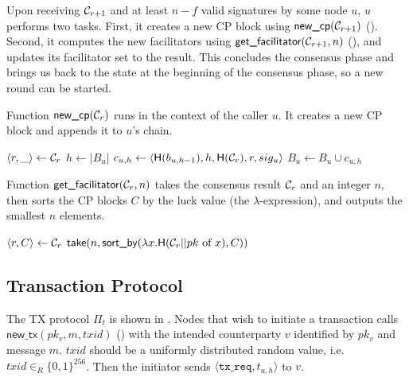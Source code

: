 Upon receiving $\mathcal{C}_{r + 1}$ and at least $n - f$ valid signatures by some node $u$, $u$ performs two tasks.
First, it creates a new CP block using $\textsf{new\_cp}(\mathcal{C}_{r + 1})$ ().
Second, it computes the new facilitators using $\textsf{get\_facilitator}(\mathcal{C}_{r + 1}, n)$ (),
and updates its facilitator set to the result.
This concludes the consensus phase and brings us back to the state at the beginning of the consensus phase,
so a new round can be started.

\begin{algorithm}
\caption{Function $\textsf{new\_cp}(\mathcal{C}_r)$ runs in the context of the caller $u$.
It creates a new CP block and appends it to $u$'s chain.}
\label{alg:new-cp}
\begin{algorithmic}
\State $\langle r, \_ \rangle \gets \mathcal{C}_r$
\State $h \gets |B_u|$
\State $c_{u, h} \gets \langle \textsf{H}(b_{u, h-1}), h, \textsf{H}(\mathcal{C}_r), r, sig_u \rangle$
\State $B_u \gets B_u \cup c_{u, h}$
\end{algorithmic}
\end{algorithm}

\begin{algorithm}
\caption{Function $\textsf{get\_facilitator}(\mathcal{C}_r, n)$ takes the consensus result $\mathcal{C}_r$ and an integer $n$,
then sorts the CP blocks $C$ by the luck value (the $\lambda$-expression), and outputs the smallest $n$ elements.}
\label{alg:facilitator}
\begin{algorithmic}
\State $\langle r, C \rangle \gets \mathcal{C}_r$
\State \Return $\textsf{take} (n, \textsf{sort\_by} (\lambda x.\textsf{H}(\mathcal{C}_r || pk \text{ of } x), C))$
\end{algorithmic}
\end{algorithm}


\subsection{Transaction Protocol}
\label{sec:tx-protocol}

The TX protocol $\Pi_t$ is shown in .
Nodes that wish to initiate a transaction calls $\textsf{new\_tx}(pk_v, m, txid)$ () with the intended counterparty $v$ identified by $pk_v$ and message $m$.
$txid$ should be a uniformly distributed random value, i.e. $txid \in_R \{0, 1\}^{256}$.
Then the initiator sends $\langle \texttt{tx\_req}, t_{u, h}\rangle$ to $v$.

